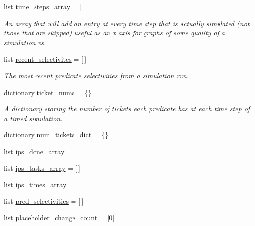 \begin{DoxyCompactItemize}
list \hyperlink{classdynamicfilterapp_1_1test__simulations_1_1_simulation_test_a75d7655922d64cff723f1ca630287683}{time\+\_\+steps\+\_\+array} = \mbox{[}$\,$\mbox{]}
\begin{DoxyCompactList}\small\item\em An array that will add an entry at every time step that is actually simulated (not those that are skipped) useful as an x axis for graphs of some quality of a simulation vs. \end{DoxyCompactList}\item 
list \hyperlink{classdynamicfilterapp_1_1test__simulations_1_1_simulation_test_a40252fb1880ae0d39411b74a939ca7d7}{recent\+\_\+selectivites} = \mbox{[}$\,$\mbox{]}
\begin{DoxyCompactList}\small\item\em The most recent predicate selectivities from a simulation run. \end{DoxyCompactList}\item 
dictionary \hyperlink{classdynamicfilterapp_1_1test__simulations_1_1_simulation_test_ae1cdb4bcaa53fc7ff453fd30fe952c36}{ticket\+\_\+nums} = \{\}
\begin{DoxyCompactList}\small\item\em A dictionary storing the number of tickets each predicate has at each time step of a timed simulation. \end{DoxyCompactList}\item 
dictionary \hyperlink{classdynamicfilterapp_1_1test__simulations_1_1_simulation_test_a1932cf55b0fd728b4535d4152da9cd70}{num\+\_\+tickets\+\_\+dict} = \{\}
\item 
list \hyperlink{classdynamicfilterapp_1_1test__simulations_1_1_simulation_test_a3a28c979e4715729a8703a138d478048}{ips\+\_\+done\+\_\+array} = \mbox{[}$\,$\mbox{]}
\item 
list \hyperlink{classdynamicfilterapp_1_1test__simulations_1_1_simulation_test_a313a3699dd7ec75b575ef56eb7d0c72a}{ips\+\_\+tasks\+\_\+array} = \mbox{[}$\,$\mbox{]}
\item 
list \hyperlink{classdynamicfilterapp_1_1test__simulations_1_1_simulation_test_ac043b655ae4e87f3cb92c37648ef7aba}{ips\+\_\+times\+\_\+array} = \mbox{[}$\,$\mbox{]}
\item 
list \hyperlink{classdynamicfilterapp_1_1test__simulations_1_1_simulation_test_addb8ece04e1f31bdd0a6d337ec23df4c}{pred\+\_\+selectivities} = \mbox{[}$\,$\mbox{]}
\item 
list \hyperlink{classdynamicfilterapp_1_1test__simulations_1_1_simulation_test_ace285c25e9e42a2458b93bc49e478c75}{placeholder\+\_\+change\+\_\+count} = \mbox{[}0\mbox{]}

\end{DoxyCompactItemize}

